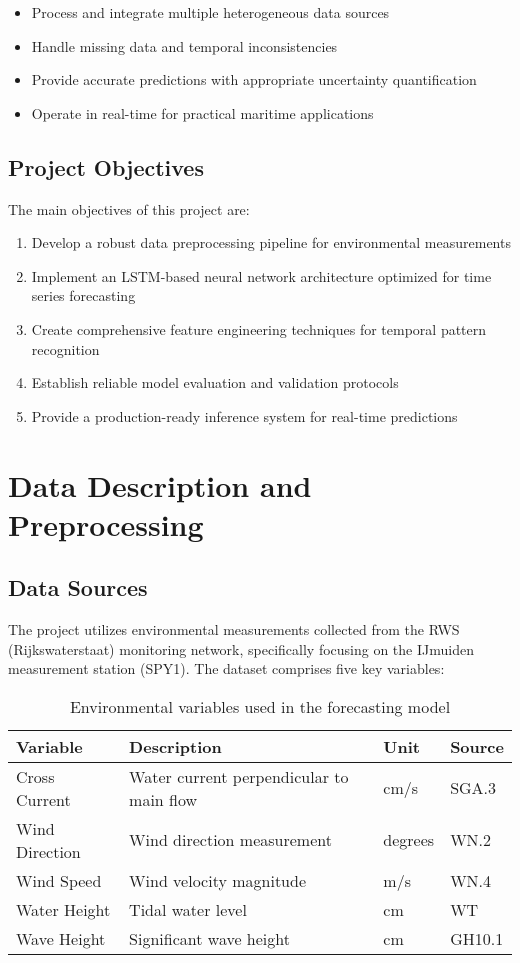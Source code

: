 \documentclass[12pt,a4paper]{article}
\begin{document}
\begin{itemize}
    \item Process and integrate multiple heterogeneous data sources
    \item Handle missing data and temporal inconsistencies
    \item Provide accurate predictions with appropriate uncertainty quantification
    \item Operate in real-time for practical maritime applications
\end{itemize}

\subsection{Project Objectives}
The main objectives of this project are:

\begin{enumerate}
    \item Develop a robust data preprocessing pipeline for environmental measurements
    \item Implement an LSTM-based neural network architecture optimized for time series forecasting
    \item Create comprehensive feature engineering techniques for temporal pattern recognition
    \item Establish reliable model evaluation and validation protocols
    \item Provide a production-ready inference system for real-time predictions
\end{enumerate}

\section{Data Description and Preprocessing}

\subsection{Data Sources}
The project utilizes environmental measurements collected from the RWS (Rijkswaterstaat) monitoring network, specifically focusing on the IJmuiden measurement station (SPY1). The dataset comprises five key variables:

\begin{table}[H]
\centering
\begin{tabular}{llll}
\toprule
Variable & Description & Unit & Source \\
\midrule
Cross Current & Water current perpendicular to main flow & cm/s & SGA.3 \\
Wind Direction & Wind direction measurement & degrees & WN.2 \\
Wind Speed & Wind velocity magnitude & m/s & WN.4 \\
Water Height & Tidal water level & cm & WT \\
Wave Height & Significant wave height & cm & GH10.1 \\
\bottomrule
\end{tabular}
\caption{Environmental variables used in the forecasting model}
\end{table}
\end{document}

